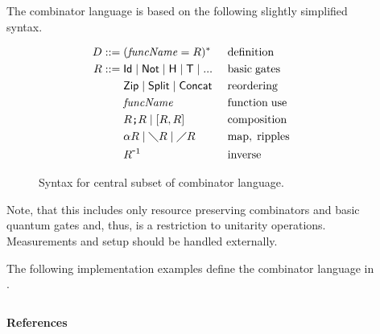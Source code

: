 \documentclass[final]{beamer}
\newlength{\sepwid}
\newlength{\onecolwid}
\begin{document}
\begin{frame}[t]
\begin{columns}[t,onlytextwidth]
\begin{column}{\onecolwid}
\begin{block}{}
  \vspace{-22mm}
The combinator language is based on the following slightly simplified syntax.

\vspace{-15mm}
\begin{figure}
\begin{align*}
D ::=&\; (\mathit{funcName} = R)^* &~& \mathrm{definition} \\
R ::=&\; \id  \;|\; \notg \;|\; \hgate \;|\; \tgate \;|\; ... &&\mathrm{basic\;gates}  \\
     &\; \zip \;|\; \spli \;|\; \concat  && \mathrm{reordering} \\
     &\; \mathit{funcName}  && \mathrm{function\;use} \\
     &\; R \o R \;|\; [R,R] && \mathrm{composition} \\
     &\; \a R \;|\;\fdown{} R \;|\; \fup{} R && \mathrm{map,\;ripples} \\%
     &\; \i{R}  && \mathrm{inverse}
\end{align*}
\caption{Syntax for central subset of combinator language.}
\end{figure}

Note, that this includes only resource preserving combinators and basic quantum gates and, thus, is a restriction to unitarity operations. Measurements and setup should be handled externally.

The following implementation examples define the combinator language in \rfun.

\end{block}

\end{column}

\begin{column}{\sepwid}~\end{column} %

\begin{column}{\onecolwid}

\RevRFunQC

\end{column}

\end{columns}

\vspace{10mm}
\textbf{\large References}






\end{frame} %
\end{document}
